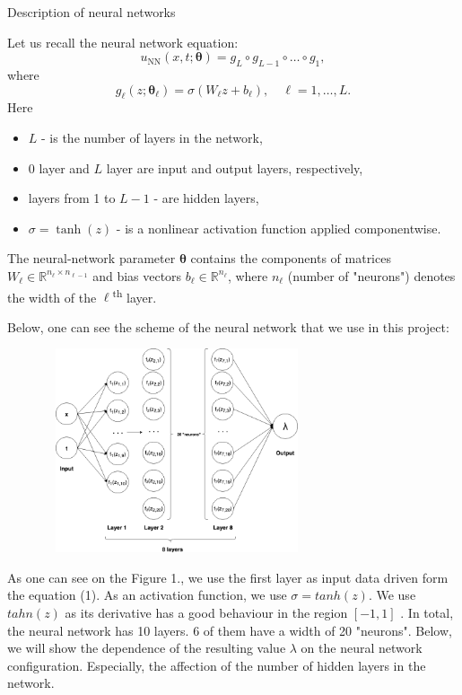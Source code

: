 \documentclass{beamer}
\renewcommand{\vec}[1]{\boldsymbol{#1}}
\newcommand{\VTheta}{\ensuremath{\vec{\theta}}}
\newcommand{\R}{\mathbb R}
\newcommand{\UNN}[1][\text{NN}]{u_{#1}}
\begin{document}
\begin{frame}{Description of neural networks}
    
Let us recall the neural network equation:
$$
\UNN(x, t; \vec{\theta}) = g_L \circ g_{L-1} \circ \dots \circ g_1,
$$
where
\[
    g_\ell(z; \VTheta_\ell) = \sigma (W_\ell z + b_\ell), \quad \ell = 1,\dots,L.
\]
Here 
\begin{itemize}
    \item $L$  - is the number of layers in the network,
    \item 0 layer and $L$ layer are input and output layers, respectively,
    \item layers from 1 to $L-1$ - are hidden layers,
    \item $\sigma = \tanh (z) $ - is a nonlinear activation function applied componentwise.
\end{itemize} 
 
The neural-network parameter $\VTheta$ contains the components of matrices
$W_\ell \in \R^{n_{\ell}\times n_{\ell-1}}$ and bias vectors
$b_\ell \in \R^{n_\ell}$, where $n_\ell$  (number of "neurons") denotes the width of the
$\ell$\textsuperscript{th} layer.
    
\end{frame}

\begin{frame}

Below, one can see the scheme of the neural network that we use in this project:
\begin{center}
\includegraphics[width = 10cm , height = 6cm]{02-presentation-v1/images/NN_scheme.png}
\\
\caption{Figure 1. Physics informed neural network.}
\end{center}
    
\end{frame}

\begin{frame}

As one can see on the Figure 1., we use the first layer as input data driven form the equation (1). As an activation function, we use $\sigma = tanh(z)$. We use $tahn(z)$ as its derivative has a good behaviour in the region $[-1, 1]$ \cite{nndesign}. In total, the neural network has 10 layers. 6 of them have a width of 20 "neurons". Below, we will show the dependence of the resulting value $\lambda$ on the neural network configuration. Especially, the affection of the number of hidden layers in the network.
    
\end{frame}
\end{document}
